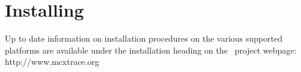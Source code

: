 \chapter{Installing \MCX}
\label{installing}
Up to date information on installation procedures on the various supported
platforms are available under the installation heading on the \MCX\ project
webpage: http://www.mcxtrace.org


